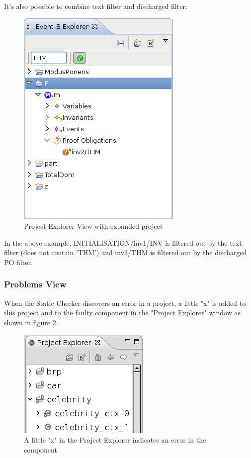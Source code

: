 It's also possible to combine text filter and discharged filter: 

\begin{figure}[!h]
\begin{center}
	\includegraphics{img/reference/ref_01_project_explorer9.png}
	\caption{Project Explorer View with expanded project}
	\label{fig_ref_01_project_explorer9}
\end{center}
\end{figure}

In the above example, INITIALISATION/inv1/INV is filtered out by the text filter (does not contain 'THM') and inv3/THM is filtered out by the discharged PO filter. 

\subsubsection{Problems View}
\label{reference_01_the_problems_view}

When the Static Checker discovers an error in a project, a little "x" is added to this project and to the faulty component in the "Project Explorer" window as shown in figure \ref{fig_ref_01_problemsview1}.

\begin{figure}[!h]
\begin{center}
	\includegraphics{img/reference/ref_01_problemsview1.png}
	\caption{A little "x" in the Project Explorer indicates an error in the component}
	\label{fig_ref_01_problemsview1}
\end{center}
\end{figure}

